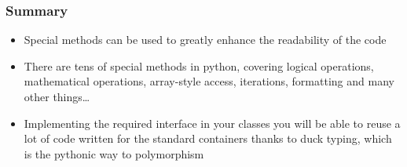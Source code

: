 \documentclass[9pt]{beamer}
\begin{document}
\begin{frame}
  \frametitle{Summary}
  \begin{itemize}
    \item Special methods can be used to greatly enhance the readability of the code
    \bigskip
    \item There are tens of special methods in python, covering logical operations,
          mathematical operations, array-style access, iterations, formatting and
          many other things\dots
    \bigskip
    \item Implementing the required interface in your classes you will be able
          to reuse a lot of code written for the standard containers thanks to
          duck typing, which is the pythonic way to polymorphism
   \end{itemize}
\end{frame}
\end{document}
